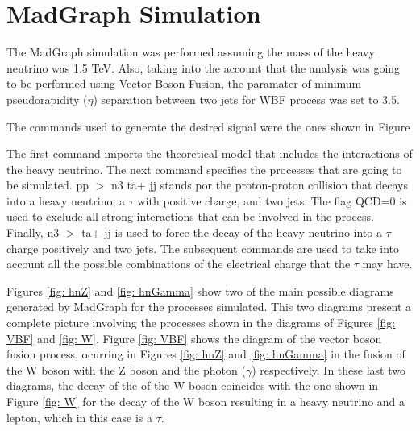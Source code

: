 \documentclass[12pt]{article}
\begin{document}
\section{MadGraph Simulation}

The MadGraph simulation was performed assuming the mass of the heavy neutrino was 1.5 TeV. Also, taking into the account that the analysis was going to be performed using Vector Boson Fusion, the paramater of minimum pseudorapidity ($\eta$) separation between two jets for WBF process was set to 3.5.

The commands used to generate the desired signal were the ones shown in Figure

The first command imports the theoretical model that includes the interactions of the heavy neutrino. The next command specifies the processes that are going to be simulated. pp $>$ n3 ta+ jj stands por the proton-proton collision that decays into a heavy neutrino, a $\tau$ with positive charge, and two jets. The flag QCD=0 is used to exclude all strong interactions that can be involved in the process. Finally, n3 $>$ ta+ jj is used to force the decay of the heavy neutrino into a $\tau$ charge positively and two jets. The subsequent commands are used to take into account all the possible combinations of the electrical charge that the $\tau$ may have.

Figures \ref{fig: hnZ} and \ref{fig: hnGamma} show two of the main possible diagrams generated by MadGraph for the processes simulated. This two diagrams present a complete picture involving the processes shown in the diagrams of Figures \ref{fig: VBF} and \ref{fig: W}. Figure \ref{fig: VBF} shows the diagram of the vector boson fusion process, ocurring in Figures \ref{fig: hnZ} and \ref{fig: hnGamma} in the fusion of the W boson with the Z boson and the photon ($\gamma$) respectively. In these last two diagrams, the decay of the of the W boson coincides with the one shown in Figure \ref{fig: W} for the decay of the W boson resulting in a heavy neutrino and a lepton, which in this case is a $\tau$. 
\end{document}
